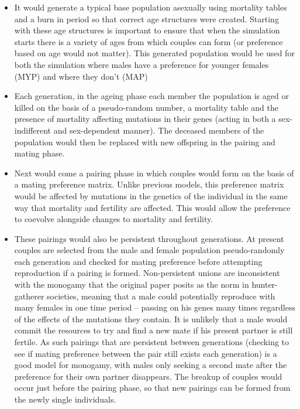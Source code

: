 \documentclass[authoryearcitations]{UoYCSproject}
\begin{document}
\begin{itemize}
\item It would generate a typical base population asexually using mortality tables and a burn in period so that correct age structures were created. Starting with these age structures is important to ensure that when the simulation starts there is a variety of ages from which couples can form (or preference based on age would not matter). This generated population would be used for both the simulation where males have a preference for younger females (MYP) and where they don't (MAP)

\item Each generation, in the ageing phase each member the population is aged or killed on the basis of a pseudo-random number, a mortality table and the presence of mortality affecting mutations in their genes (acting in both a sex-indifferent and sex-dependent manner). The deceased members of the population would then be replaced with new offspring in the pairing and mating phase.

\item Next would come a pairing phase in which couples would form on the basis of a mating preference matrix. Unlike previous models, this preference matrix would be affected by mutations in the genetics of the individual in the same way that mortality and fertility are affected. This would allow the preference to coevolve alongside changes to mortality and fertility.

\item These pairings would also be persistent throughout generations. At present couples are selected from the male and female population pseudo-randomly each generation and checked for mating preference before attempting reproduction if a pairing is formed. Non-persistent unions are inconsistent with the monogamy that the original paper posits as the norm in hunter-gatherer societies, meaning that a male could potentially reproduce with many females in one time period -- passing on his genes many times regardless of the effects of the mutations they contain. It is unlikely that a male would commit the resources to try and find a new mate if his present partner is still fertile. As such pairings that are persistent between generations (checking to see if mating preference between the pair still exists each generation) is a good model for monogamy, with males only seeking a second mate after the preference for their own partner disappears. The breakup of couples would occur just before the pairing phase, so that new pairings can be formed from the newly single individuals.


\end{itemize}
\end{document}
